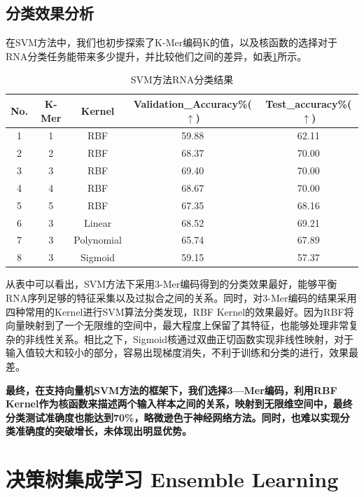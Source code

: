 \documentclass[a4paper,11pt,AutoFakeBold]{ctexart}
\begin{document}
\subsection{分类效果分析}
在SVM方法中，我们也初步探索了K-Mer编码K的值，以及核函数的选择对于RNA分类任务能带来多少提升，并比较他们之间的差异，如表\ref{tab:SVM方法RNA分类}所示。


\begin{table}[h]
\centering
\footnotesize
\setlength{\tabcolsep}{5pt}
\caption{SVM方法RNA分类结果}
\label{tab:SVM方法RNA分类}
{
    \begin{tabular}{ccccc}
    \toprule
    \textbf{No.} & \textbf{K-Mer} & \textbf{Kernel}  & \textbf{Validation\_Accuracy\%}($\uparrow$)  & \textbf{Test\_accuracy\%}($\uparrow$)
    \\
    \midrule
    1 & 1 & RBF & 59.88 & 62.11 \\
    2 & 2 & RBF & 68.37 & 70.00 \\
    3 & 3 & RBF & 69.40 & 70.00 \\
    4 & 4 & RBF & 68.67 & 70.00\\
    5 & 5 & RBF & 67.35 & 68.16\\
    6 & 3 & Linear & 68.52 & 69.21 \\
    7 & 3 & Polynomial & 65.74 & 67.89\\
    8 & 3 & Sigmoid & 59.15 & 57.37 \\
    \bottomrule
    \end{tabular}
}
\end{table}

从表中可以看出，SVM方法下采用3-Mer编码得到的分类效果最好，能够平衡RNA序列足够的特征采集以及过拟合之间的关系。同时，对3-Mer编码的结果采用四种常用的Kernel进行SVM算法分类发现，RBF Kernel的效果最好。因为RBF将向量映射到了一个无限维的空间中，最大程度上保留了其特征，也能够处理非常复杂的非线性关系。相比之下，Sigmoid核通过双曲正切函数实现非线性映射，对于输入值较大和较小的部分，容易出现梯度消失，不利于训练和分类的进行，效果最差。

\textbf{最终，在支持向量机SVM方法的框架下，我们选择3—Mer编码，利用RBF Kernel作为核函数来描述两个输入样本之间的关系，映射到无限维空间中，最终分类测试准确度也能达到70\%，略微逊色于神经网络方法。同时，也难以实现分类准确度的突破增长，未体现出明显优势。}

\section{决策树集成学习 Ensemble Learning}
\end{document}
